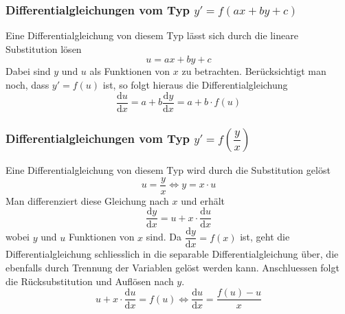 \subsubsection{Differentialgleichungen vom Typ $y'=f\left(ax+by+c\right)$}
Eine Differentialgleichung von diesem Typ lässt sich durch die lineare Substitution lösen
\begin{equation}
\boxed{u=ax+by+c}
\end{equation}
Dabei sind $y$ und $u$ als Funktionen von $x$ zu betrachten. Berücksichtigt man noch, dass $y'=f\left(u\right)$ ist, so folgt hieraus die Differentialgleichung
\begin{equation}
\boxed{\dfrac{\text{d}u}{\text{d}x}=a+b\dfrac{\text{d}y}{\text{d}x}=a+b\cdot f\left(u\right)}
\end{equation}
\subsubsection{Differentialgleichungen vom Typ $y'=f\left(\dfrac{y}{x}\right)$}
Eine Differentialgleichung von diesem Typ wird durch die Substitution gelöst
\begin{equation}
\boxed{u=\dfrac{y}{x}\Longleftrightarrow y=x\cdot u}
\end{equation}
Man differenziert diese Gleichung nach $x$ und erhält
\begin{equation}
\boxed{\dfrac{\text{d}y}{\text{d}x}=u+x\cdot \dfrac{\text{d}u}{\text{d}x}}
\end{equation}
wobei $y$ und $u$ Funktionen von $x$ sind. Da $\dfrac{\text{d}y}{\text{d}x}=f\left(x\right)$ ist, geht die Differentialgleichung schliesslich in die separable Differentialgleichung über, die ebenfalls durch Trennung der Variablen gelöst werden kann. Anschluessen folgt die Rücksubstitution und Auflösen nach $y$.
\begin{equation} 
\boxed{u+x\cdot \dfrac{\text{d}u}{\text{d}x}=f\left(u\right)\Longleftrightarrow \dfrac{\text{d}u}{\text{d}x}=\dfrac{f\left(u\right)-u}{x}}
\end{equation} 
